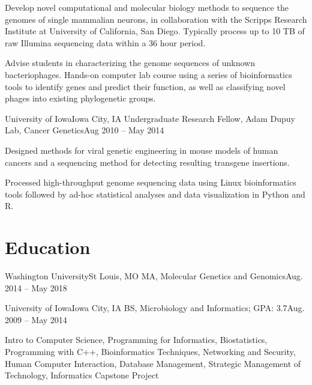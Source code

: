             {Develop novel computational and molecular biology methods to sequence the genomes of single mammalian neurons, in collaboration with the Scripps Research Institute at University of California, San Diego. Typically process up to 10 TB of raw Illumina sequencing data within a 36 hour period.}
            
            {Advise students in characterizing the genome sequences of unknown bacteriophages. Hands-on computer lab course using a series of bioinformatics tools to identify genes and predict their function, as well as classifying novel phages into existing phylogenetic groups.}

        \resumeItemListEnd

        \resumeSubheading
        {University of Iowa}{Iowa City, IA}
        {Undergraduate Research Fellow, Adam Dupuy Lab, Cancer Genetics}{Aug 2010 -- May 2014}

        \resumeItemListStart

            {Designed methods for viral genetic engineering in mouse models of human cancers and a sequencing method for detecting resulting transgene insertions.}
            
            {Processed high-throughput genome sequencing data using Linux bioinformatics tools followed by ad-hoc statistical analyses and data visualization in Python and R.}

        \resumeItemListEnd

    \resumeSubHeadingListEnd

\section{Education}
   \resumeSubHeadingListStart
   
      \resumeSubheading
      {Washington University}{St Louis, MO}
      {MA, Molecular Genetics and Genomics}{Aug. 2014 -- May 2018}
      
      \resumeSubheading
      {University of Iowa}{Iowa City, IA}
      {BS, Microbiology and Informatics;  GPA: 3.7}{Aug. 2009 -- May 2014}
      
      \resumeItemListStart
      
         {Intro to Computer Science, Programming for Informatics, Biostatistics, Programming with C++, Bioinformatics Techniques, Networking and Security, Human Computer Interaction, Database Management, Strategic Management of Technology, Informatics Capstone Project}
      
